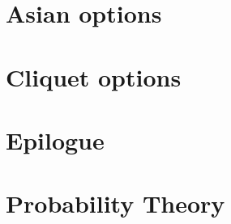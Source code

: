 \documentclass[12pt,a4paper,oneside]{amsbook}
\begin{document}
\chapter{Asian options}
\label{cha:asian}


\chapter{Cliquet options}
\label{cha:cliquet}


\chapter{Epilogue}
\label{cha:epilogue}



\appendix
\chapter{Probability Theory}
\label{cha:probability}



\backmatter

\listoffigures


\printbibliography
\end{document}
